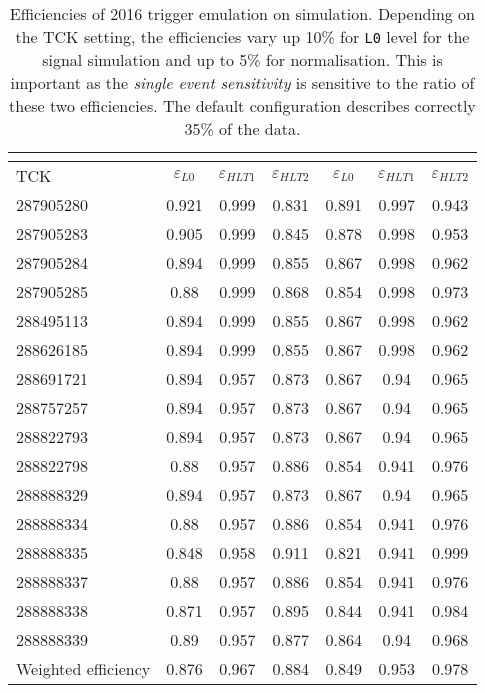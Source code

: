 \begin{table}[H]
\begin{center}
\begin{tabular}{ l |  c  c  c | c  c  c }\toprule
	\multicolumn{1}{c|}{} & \multicolumn{3}{c|}{\Bmumumu } & \multicolumn{3}{c}{\bjpsimumuk} \\ \hline
 TCK & $\varepsilon_{L0}$ & $\varepsilon_{HLT1}$ & $\varepsilon_{HLT2}$ & $\varepsilon_{L0}$ & $\varepsilon_{HLT1}$ & $\varepsilon_{HLT2}$ \\
\hline
287905280 & 0.921 & 0.999 & 0.831 & 0.891 & 0.997 & 0.943 \\
287905283 & 0.905 & 0.999 & 0.845 & 0.878 & 0.998 & 0.953 \\
287905284 & 0.894 & 0.999 & 0.855 & 0.867 & 0.998 & 0.962 \\
287905285 & 0.88 & 0.999 & 0.868 & 0.854 & 0.998 & 0.973 \\
288495113 & 0.894 & 0.999 & 0.855 & 0.867 & 0.998 & 0.962 \\
288626185 & 0.894 & 0.999 & 0.855 & 0.867 & 0.998 & 0.962 \\
288691721 & 0.894 & 0.957 & 0.873 & 0.867 & 0.94 & 0.965 \\
288757257 & 0.894 & 0.957 & 0.873 & 0.867 & 0.94 & 0.965 \\
288822793 & 0.894 & 0.957 & 0.873 & 0.867 & 0.94 & 0.965 \\
288822798 & 0.88 & 0.957 & 0.886 & 0.854 & 0.941 & 0.976 \\
288888329 & 0.894 & 0.957 & 0.873 & 0.867 & 0.94 & 0.965 \\
288888334 & 0.88 & 0.957 & 0.886 & 0.854 & 0.941 & 0.976 \\
288888335 & 0.848 & 0.958 & 0.911 & 0.821 & 0.941 & 0.999 \\
288888337 & 0.88 & 0.957 & 0.886 & 0.854 & 0.941 & 0.976 \\
288888338 & 0.871 & 0.957 & 0.895 & 0.844 & 0.941 & 0.984 \\
288888339 & 0.89 & 0.957 & 0.877 & 0.864 & 0.94 & 0.968 \\
\hline
Weighted efficiency & 0.876 & 0.967 & 0.884 & 0.849 & 0.953 & 0.978 \\
\bottomrule
\end{tabular}
\end{center}
\caption{Efficiencies of 2016 trigger emulation on simulation. Depending on the TCK setting, the efficiencies vary up 10\% for \texttt{L0} level for the signal simulation and up to 5\% for normalisation. This is important as the \textit{single event sensitivity} is sensitive to the ratio of these two efficiencies. The default configuration describes correctly 35\% of the data.}
\label{tab:L0andHLT1Calib}
\end{table}



